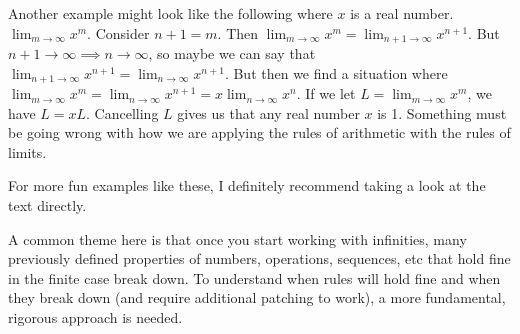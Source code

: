 \documentclass[answers,12pt]{exam}
\begin{document}
Another example might look like the following where $x$ is a real number.
$\lim_{m \rightarrow \infty} x^m$.
Consider $n+1 = m$.
Then $\lim_{m \rightarrow \infty} x^m = \lim_{n+1 \rightarrow \infty} x^{n+1}$.
But $n+1 \rightarrow \infty \implies n \rightarrow \infty$, so maybe we can say that $\lim_{n+1 \rightarrow \infty} x^{n+1} = \lim_{n \rightarrow \infty} x^{n+1}$.
But then we find a situation where $\lim_{m \rightarrow \infty} x^m =  \lim_{n \rightarrow \infty} x^{n+1} = x \lim_{n \rightarrow \infty} x^{n}$.
If we let $L = \lim_{m \rightarrow \infty} x^m $, we have $L = xL$.
Cancelling $L$ gives us that any real number $x$ is 1.
Something must be going wrong with how we are applying the rules of arithmetic with the rules of limits.

For more fun examples like these, I definitely recommend taking a look at the text directly.

A common theme here is that once you start working with infinities, many previously defined properties of numbers, operations, sequences, etc that hold fine in the finite case break down. 
To understand when rules will hold fine and when they break down (and require additional patching to work), a more fundamental, rigorous approach is needed.
\end{document}
